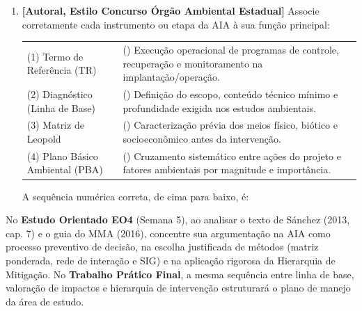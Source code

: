 \begin{enumerate}[leftmargin=1.8em, itemsep=5pt, resume]
  \item \textbf{[Autoral, Estilo Concurso Órgão Ambiental Estadual]} Associe corretamente cada instrumento ou etapa da AIA à sua função principal:
  \begin{center}
  \small
  \begin{tabularx}{0.96\linewidth}{@{}l X@{}}
    (1) Termo de Referência (TR) & (\quad) Execução operacional de programas de controle, recuperação e monitoramento na implantação/operação. \\
    (2) Diagnóstico (Linha de Base) & (\quad) Definição do escopo, conteúdo técnico mínimo e profundidade exigida nos estudos ambientais. \\
    (3) Matriz de Leopold & (\quad) Caracterização prévia dos meios físico, biótico e socioeconômico antes da intervenção. \\
    (4) Plano Básico Ambiental (PBA) & (\quad) Cruzamento sistemático entre ações do projeto e fatores ambientais por magnitude e importância. \\
  \end{tabularx}
  \end{center}
  A sequência numérica correta, de cima para baixo, é:
  \espacoResolucao[1.2cm]
\end{enumerate}

\begin{boxDica}
  No \textbf{Estudo Orientado EO4} (Semana 5), ao analisar o texto de Sánchez (2013, cap. 7) e o guia do MMA (2016), concentre sua argumentação na AIA como processo preventivo de decisão, na escolha justificada de métodos (matriz ponderada, rede de interação e SIG) e na aplicação rigorosa da Hierarquia de Mitigação. No \textbf{Trabalho Prático Final}, a mesma sequência entre linha de base, valoração de impactos e hierarquia de intervenção estruturará o plano de manejo da área de estudo.
\end{boxDica}

\clearpage
{}

